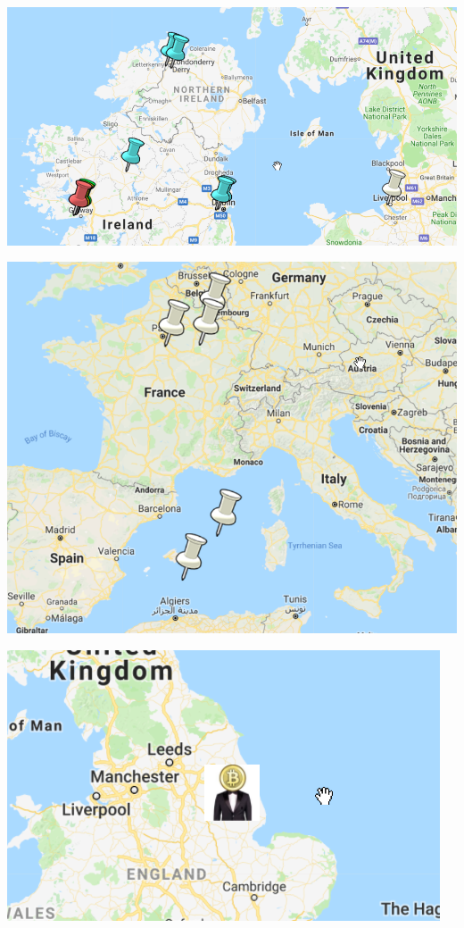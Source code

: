 \includegraphics[]{img/map1.png}

\includegraphics[]{img/map2.png}

\includegraphics[]{img/map3.png}

